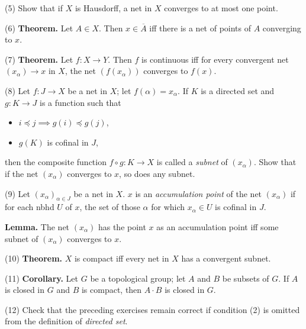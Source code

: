 \documentclass[a4paper]{article}
\begin{document}
(5) Show that if $X$ is Hausdorff, a net in $X$ converges to at most one point.

(6) \textbf{Theorem.} Let $A \in X$. Then $x \in \overline{A}$ iff there is a net of points of $A$ converging to $x$.

(7) \textbf{Theorem.} Let $f : X \to Y$. Then $f$ is continuous iff for every convergent net $(x_\alpha) \to x$ in $X$, the net $(f(x_\alpha))$ converges to $f(x)$.

(8) Let $f : J \to X$ be a net in $X$; let $f(\alpha) = x_\alpha$. If $K$ is a directed set and $g : K \to J$ is a function such that

\begin{itemize}
    \item $i \preceq j \implies g(i) \preceq g(j)$,
    \item $g(K)$ is cofinal in $J$,
\end{itemize}

then the composite function $f \circ g : K \to X$ is called a \emph{subnet} of $(x_\alpha)$. Show that if the net $(x_\alpha)$ converges to $x$, so does any subnet.

(9) Let $(x_\alpha)_{\alpha \in J}$ be a net in $X$. $x$ is an \emph{accumulation point} of the net $(x_\alpha)$ if for each nbhd $U$ of $x$, the set of those $\alpha$ for which $x_\alpha \in U$ is cofinal in $J$.

\textbf{Lemma.} The net $(x_\alpha)$ has the point $x$ as an accumulation point iff some subnet of $(x_\alpha)$ converges to $x$.

(10) \textbf{Theorem.} $X$ is compact iff every net in $X$ has a convergent subnet.

(11) \textbf{Corollary.} Let $G$ be a topological group; let $A$ and $B$ be subsets of $G$. If $A$ is closed in $G$ and $B$ is compact, then $A \cdot B$ is closed in $G$.

(12) Check that the preceding exercises remain correct if condition (2) is omitted from the definition of \emph{directed set}.
\end{document}
